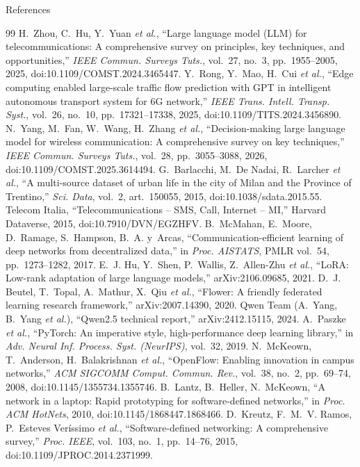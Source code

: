 \documentclass[11pt,aspectratio=169]{beamer}
\begin{document}
\begin{frame}[allowframebreaks]{References}
\begin{thebibliography}{99}
     H.~Zhou, C.~Hu, Y.~Yuan \emph{et al.}, ``Large language model (LLM) for telecommunications: A comprehensive survey on principles, key techniques, and opportunities,'' \emph{IEEE Commun. Surveys Tuts.}, vol.~27, no.~3, pp.~1955--2005, 2025, doi:10.1109/COMST.2024.3465447.
     Y.~Rong, Y.~Mao, H.~Cui \emph{et al.}, ``Edge computing enabled large-scale traffic flow prediction with GPT in intelligent autonomous transport system for 6G network,'' \emph{IEEE Trans. Intell. Transp. Syst.}, vol.~26, no.~10, pp.~17321--17338, 2025, doi:10.1109/TITS.2024.3456890.
     N.~Yang, M.~Fan, W.~Wang, H.~Zhang \emph{et al.}, ``Decision-making large language model for wireless communication: A comprehensive survey on key techniques,'' \emph{IEEE Commun. Surveys Tuts.}, vol.~28, pp.~3055--3088, 2026, doi:10.1109/COMST.2025.3614494.
    \framebreak
     G.~Barlacchi, M.~De Nadai, R.~Larcher \emph{et al.}, ``A multi-source dataset of urban life in the city of Milan and the Province of Trentino,'' \emph{Sci. Data}, vol.~2, art.~150055, 2015, doi:10.1038/sdata.2015.55.
     Telecom Italia, ``Telecommunications -- SMS, Call, Internet -- MI,'' Harvard Dataverse, 2015, doi:10.7910/DVN/EGZHFV.
     B.~McMahan, E.~Moore, D.~Ramage, S.~Hampson, B.~A. y~Arcas, ``Communication-efficient learning of deep networks from decentralized data,'' in \emph{Proc. AISTATS}, PMLR vol.~54, pp.~1273--1282, 2017.
     E.~J. Hu, Y.~Shen, P.~Wallis, Z.~Allen-Zhu \emph{et al.}, ``LoRA: Low-rank adaptation of large language models,'' arXiv:2106.09685, 2021.
     D.~J. Beutel, T.~Topal, A.~Mathur, X.~Qiu \emph{et al.}, ``Flower: A friendly federated learning research framework,'' arXiv:2007.14390, 2020.
     Qwen Team (A.~Yang, B.~Yang \emph{et al.}), ``Qwen2.5 technical report,'' arXiv:2412.15115, 2024.
     A.~Paszke \emph{et al.}, ``PyTorch: An imperative style, high-performance deep learning library,'' in \emph{Adv. Neural Inf. Process. Syst. (NeurIPS)}, vol.~32, 2019.
     N.~McKeown, T.~Anderson, H.~Balakrishnan \emph{et al.}, ``OpenFlow: Enabling innovation in campus networks,'' \emph{ACM SIGCOMM Comput. Commun. Rev.}, vol.~38, no.~2, pp.~69--74, 2008, doi:10.1145/1355734.1355746.
     B.~Lantz, B.~Heller, N.~McKeown, ``A network in a laptop: Rapid prototyping for software-defined networks,'' in \emph{Proc. ACM HotNets}, 2010, doi:10.1145/1868447.1868466.
     D.~Kreutz, F.~M.~V. Ramos, P.~Esteves Ver\'issimo \emph{et al.}, ``Software-defined networking: A comprehensive survey,'' \emph{Proc. IEEE}, vol.~103, no.~1, pp.~14--76, 2015, doi:10.1109/JPROC.2014.2371999.
  \end{thebibliography}
\end{frame}
\end{document}
